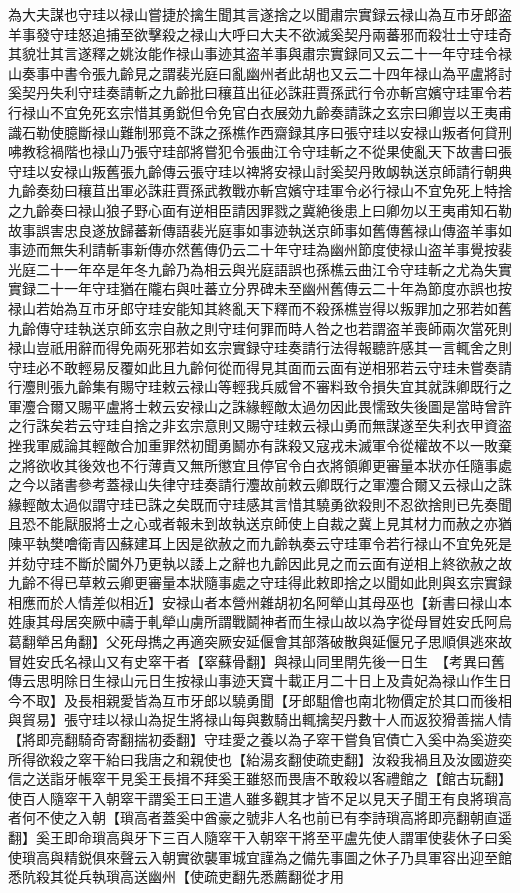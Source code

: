 為大夫謀也守珪以禄山嘗捷於擒生聞其言遂捨之以聞肅宗實録云禄山為互市牙郎盗羊事發守珪怒追捕至欲擊殺之禄山大呼曰大夫不欲滅奚契丹兩蕃邪而殺壮士守珪奇其貌壮其言遂釋之姚汝能作禄山事迹其盗羊事與肅宗實録同又云二十一年守珪令禄山奏事中書令張九齡見之謂裴光庭曰亂幽州者此胡也又云二十四年禄山為平盧將討奚契丹失利守珪奏請斬之九齡批曰穰苴出征必誅莊賈孫武行令亦斬宫嬪守珪軍令若行禄山不宜免死玄宗惜其勇鋭但令免官白衣展効九齡奏請誅之玄宗曰卿豈以王夷甫識石勒使臆斷禄山難制邪竟不誅之孫樵作西齋録其序曰張守珪以安禄山叛者何貸刑咈教稔禍階也禄山乃張守珪部將嘗犯令張曲江令守珪斬之不從果使亂天下故書曰張守珪以安禄山叛舊張九齡傳云張守珪以禆將安禄山討奚契丹敗衂執送京師請行朝典九齡奏劾曰穰苴出軍必誅莊賈孫武教戰亦斬宫嬪守珪軍令必行禄山不宜免死上特捨之九齡奏曰禄山狼子野心面有逆相臣請因罪戮之冀絶後患上曰卿勿以王夷甫知石勒故事誤害忠良遂放歸蕃新傳語裴光庭事如事迹執送京師事如舊傳舊禄山傳盗羊事如事迹而無失利請斬事新傳亦然舊傳仍云二十年守珪為幽州節度使禄山盗羊事覺按裴光庭二十一年卒是年冬九齡乃為相云與光庭語誤也孫樵云曲江令守珪斬之尤為失實實録二十一年守珪猶在隴右與吐蕃立分界碑未至幽州舊傳云二十年為節度亦誤也按禄山若始為互市牙郎守珪安能知其終亂天下釋而不殺孫樵豈得以叛罪加之邪若如舊九齡傳守珪執送京師玄宗自赦之則守珪何罪而時人咎之也若謂盗羊喪師兩次當死則禄山豈祇用辭而得免兩死邪若如玄宗實録守珪奏請行法得報聽許感其一言輒舍之則守珪必不敢輕易反覆如此且九齡何從而得見其面而云面有逆相邪若云守珪未嘗奏請行灋則張九齡集有賜守珪敕云禄山等輕我兵威曾不審料致令損失宜其就誅卿既行之軍灋合爾又賜平盧將士敕云安禄山之誅緣輕敵太過勿因此畏懦致失後圖是當時曾許之行誅矣若云守珪自捨之非玄宗意則又賜守珪敕云禄山勇而無謀遂至失利衣甲資盗挫我軍威論其輕敵合加重罪然初聞勇鬭亦有誅殺又寇戎未滅軍令從權故不以一敗棄之將欲收其後效也不行薄責又無所懲宜且停官令白衣將領卿更審量本狀亦任隨事處之今以諸書參考蓋禄山失律守珪奏請行灋故前敕云卿既行之軍灋合爾又云禄山之誅緣輕敵太過似謂守珪已誅之矣既而守珪感其言惜其驍勇欲殺則不忍欲捨則已先奏聞且恐不能厭服將士之心或者報未到故執送京師使上自裁之冀上見其材力而赦之亦猶陳平執樊噲衛青囚蘇建耳上因是欲赦之而九齡執奏云守珪軍令若行禄山不宜免死是并劾守珪不斷於閫外乃更執以諉上之辭也九齡因此見之而云面有逆相上終欲赦之故九齡不得已草敕云卿更審量本狀隨事處之守珪得此敕即捨之以聞如此則與玄宗實録相應而於人情差似相近】安禄山者本營州雜胡初名阿犖山其母巫也【新書曰禄山本姓康其母居突厥中禱于軋犖山虜所謂戰鬬神者而生禄山故以為字從母冒姓安氏阿烏葛翻犖呂角翻】父死母擕之再適突厥安延偃會其部落破散與延偃兄子思順俱逃來故冒姓安氏名禄山又有史窣干者【窣蘇骨翻】與禄山同里閈先後一日生　【考異曰舊傳云思明除日生禄山元日生按禄山事迹天寶十載正月二十日上及貴妃為禄山作生日今不取】及長相親愛皆為互市牙郎以驍勇聞【牙郎駔儈也南北物價定於其口而後相與貿易】張守珪以禄山為捉生將禄山每與數騎出輒擒契丹數十人而返狡猾善揣人情【將即亮翻騎奇寄翻揣初委翻】守珪愛之養以為子窣干嘗負官債亡入奚中為奚遊奕所得欲殺之窣干紿曰我唐之和親使也【紿湯亥翻使疏吏翻】汝殺我禍且及汝國遊奕信之送詣牙帳窣干見奚王長揖不拜奚王雖怒而畏唐不敢殺以客禮館之【館古玩翻】使百人隨窣干入朝窣干謂奚王曰王遣人雖多觀其才皆不足以見天子聞王有良將瑣高者何不使之入朝【瑣高者蓋奚中酋豪之號非人名也前已有李詩瑣高將即亮翻朝直遥翻】奚王即命瑣高與牙下三百人隨窣干入朝窣干將至平盧先使人謂軍使裴休子曰奚使瑣高與精鋭俱來聲云入朝實欲襲軍城宜謹為之備先事圖之休子乃具軍容出迎至館悉阬殺其從兵執瑣高送幽州【使疏吏翻先悉薦翻從才用